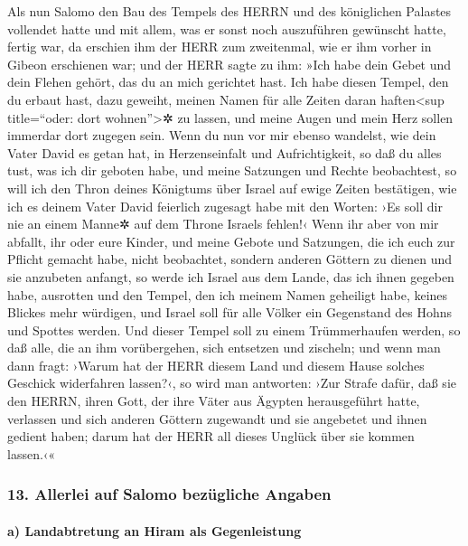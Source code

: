 Als nun Salomo den Bau des Tempels des HERRN und des
königlichen Palastes vollendet hatte und mit allem, was er sonst noch
auszuführen gewünscht hatte, fertig war, da erschien ihm
der HERR zum zweitenmal, wie er ihm vorher in Gibeon erschienen war;
und der HERR sagte zu ihm: »Ich habe dein Gebet und dein
Flehen gehört, das du an mich gerichtet hast. Ich habe diesen Tempel,
den du erbaut hast, dazu geweiht, meinen Namen für alle Zeiten daran
haften\textless sup title=``oder: dort wohnen''\textgreater✲ zu lassen,
und meine Augen und mein Herz sollen immerdar dort zugegen sein.
Wenn du nun vor mir ebenso wandelst, wie dein Vater David
es getan hat, in Herzenseinfalt und Aufrichtigkeit, so daß du alles
tust, was ich dir geboten habe, und meine Satzungen und Rechte
beobachtest, so will ich den Thron deines Königtums über
Israel auf ewige Zeiten bestätigen, wie ich es deinem Vater David
feierlich zugesagt habe mit den Worten: ›Es soll dir nie an einem Manne✲
auf dem Throne Israels fehlen!‹ Wenn ihr aber von mir
abfallt, ihr oder eure Kinder, und meine Gebote und Satzungen, die ich
euch zur Pflicht gemacht habe, nicht beobachtet, sondern anderen Göttern
zu dienen und sie anzubeten anfangt, so werde ich Israel
aus dem Lande, das ich ihnen gegeben habe, ausrotten und den Tempel, den
ich meinem Namen geheiligt habe, keines Blickes mehr würdigen, und
Israel soll für alle Völker ein Gegenstand des Hohns und Spottes werden.
Und dieser Tempel soll zu einem Trümmerhaufen werden, so
daß alle, die an ihm vorübergehen, sich entsetzen und zischeln; und wenn
man dann fragt: ›Warum hat der HERR diesem Land und diesem Hause solches
Geschick widerfahren lassen?‹, so wird man antworten: ›Zur
Strafe dafür, daß sie den HERRN, ihren Gott, der ihre Väter aus Ägypten
herausgeführt hatte, verlassen und sich anderen Göttern zugewandt und
sie angebetet und ihnen gedient haben; darum hat der HERR all dieses
Unglück über sie kommen lassen.‹«

\hypertarget{allerlei-auf-salomo-bezuxfcgliche-angaben}{%
\subsubsection{13. Allerlei auf Salomo bezügliche
Angaben}\label{allerlei-auf-salomo-bezuxfcgliche-angaben}}

\hypertarget{a-landabtretung-an-hiram-als-gegenleistung}{%
\paragraph{a) Landabtretung an Hiram als
Gegenleistung}\label{a-landabtretung-an-hiram-als-gegenleistung}}

